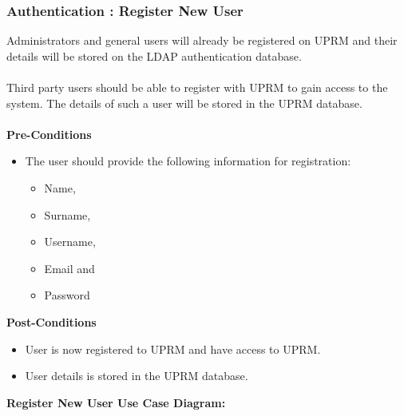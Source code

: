 \subsubsection{Authentication : Register New User}
Administrators and general users will already be registered on UPRM and their details will be stored on the LDAP authentication database.\\ \\
Third party users should be able to register with UPRM to gain access to the system. The details of such a user will be stored in the UPRM database.\\ \\
\textbf{Pre-Conditions}
\begin{itemize}
	\item The user should provide the following information for registration:
	\begin{itemize}
		\item Name,
		\item Surname,
		\item Username,
		\item Email and
		\item Password \\
	\end{itemize}
\end{itemize}
\textbf{Post-Conditions}
\begin{itemize}
	\item User is now registered to UPRM and have access to UPRM.
	\item User details is stored in the UPRM database.\\
\end{itemize}
\textbf{Register New User Use Case Diagram:}\\
\centerline{}
